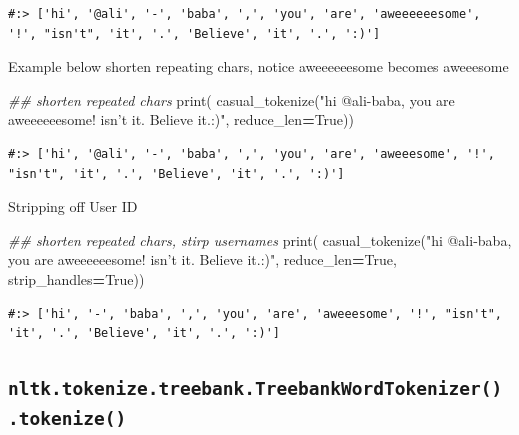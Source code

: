 \documentclass[
]{book}
\newenvironment{Shaded}{\begin{snugshade}}{\end{snugshade}}
\newcommand{\BuiltInTok}[1]{#1}
\newcommand{\CommentTok}[1]{\textcolor[rgb]{0.37,0.37,0.37}{\textit{#1}}}
\newcommand{\NormalTok}[1]{#1}
\newcommand{\OperatorTok}[1]{\textcolor[rgb]{0.43,0.43,0.43}{\textbf{#1}}}
\newcommand{\StringTok}[1]{\textcolor[rgb]{0.5,0.5,0.5}{#1}}
\newcommand{\VariableTok}[1]{\textcolor[rgb]{0,0,0}{#1}}
\begin{document}
\begin{verbatim}
#:> ['hi', '@ali', '-', 'baba', ',', 'you', 'are', 'aweeeeeesome', '!', "isn't", 'it', '.', 'Believe', 'it', '.', ':)']
\end{verbatim}

Example below shorten repeating chars, notice aweeeeeesome becomes aweeesome

\begin{Shaded}
\begin{Highlighting}[]
\CommentTok{## shorten repeated chars}
\BuiltInTok{print}\NormalTok{( casual_tokenize(}\StringTok{"hi @ali-baba, you are aweeeeeesome! isn't it. Believe it.:)"}\NormalTok{, }
\NormalTok{          reduce_len}\OperatorTok{=}\VariableTok{True}\NormalTok{))     }
\end{Highlighting}
\end{Shaded}

\begin{verbatim}
#:> ['hi', '@ali', '-', 'baba', ',', 'you', 'are', 'aweeesome', '!', "isn't", 'it', '.', 'Believe', 'it', '.', ':)']
\end{verbatim}

Stripping off User ID

\begin{Shaded}
\begin{Highlighting}[]
\CommentTok{## shorten repeated chars, stirp usernames}
\BuiltInTok{print}\NormalTok{( casual_tokenize(}\StringTok{"hi @ali-baba, you are aweeeeeesome! isn't it. Believe it.:)"}\NormalTok{, }
\NormalTok{          reduce_len}\OperatorTok{=}\VariableTok{True}\NormalTok{,      }
\NormalTok{          strip_handles}\OperatorTok{=}\VariableTok{True}\NormalTok{))  }
\end{Highlighting}
\end{Shaded}

\begin{verbatim}
#:> ['hi', '-', 'baba', ',', 'you', 'are', 'aweeesome', '!', "isn't", 'it', '.', 'Believe', 'it', '.', ':)']
\end{verbatim}

\hypertarget{nltk.tokenize.treebank.treebankwordtokenizer.tokenize}{%
\subsection{\texorpdfstring{\texttt{nltk.tokenize.treebank.TreebankWordTokenizer().tokenize()}}{nltk.tokenize.treebank.TreebankWordTokenizer().tokenize()}}\label{nltk.tokenize.treebank.treebankwordtokenizer.tokenize}}
\end{document}
